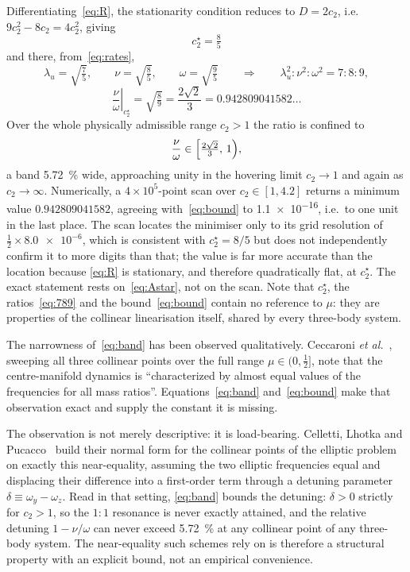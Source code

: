 \documentclass[pdflatex,sn-mathphys-num]{sn-jnl}
\begin{document}
Differentiating~\eqref{eq:R}, the stationarity condition reduces to $D=2c_2$,
i.e. $9c_2^{2}-8c_2=4c_2^{2}$, giving
\begin{equation}
  \boxed{\;c_2^\star = \tfrac{8}{5}\;}
  \label{eq:Astar}
\end{equation}
and there, from~\eqref{eq:rates},
\begin{equation}
  \lambda_u = \sqrt{\tfrac{7}{5}},\qquad
  \nu = \sqrt{\tfrac{8}{5}},\qquad
  \omega = \sqrt{\tfrac{9}{5}}
  \qquad\Longrightarrow\qquad
  \lambda_u^{2}:\nu^{2}:\omega^{2} = 7:8:9 ,
  \label{eq:789}
\end{equation}
\begin{equation}
  \left.\frac{\nu}{\omega}\right|_{c_2^\star} = \sqrt{\tfrac{8}{9}}
  = \frac{2\sqrt2}{3} = 0.942809041582\ldots
  \label{eq:bound}
\end{equation}
Over the whole physically admissible range $c_2>1$ the ratio is confined to
\begin{equation}
  \frac{\nu}{\omega} \in \Bigl[\tfrac{2\sqrt2}{3},\,1\Bigr) ,
  \label{eq:band}
\end{equation}
a band \SI{5.72}{\percent} wide, approaching unity in the hovering limit
$c_2\to1$ and again as $c_2\to\infty$. Numerically, a $4\times10^{5}$-point scan
over $c_2\in[1,4.2]$ returns a minimum value $0.942809041582$, agreeing
with~\eqref{eq:bound} to \num{1.1e-16}, i.e.\ to one unit in the last place.
The scan locates the minimiser only to its grid resolution of
$\tfrac12\times\num{8.0e-6}$, which is consistent with $c_2^\star=8/5$ but does
not independently confirm it to more digits than that; the value is far more
accurate than the location because \eqref{eq:R} is stationary, and therefore
quadratically flat, at $c_2^\star$. The exact statement rests
on~\eqref{eq:Astar}, not on the scan. Note that $c_2^\star$, the ratios~\eqref{eq:789} and the
bound~\eqref{eq:bound} contain no reference to $\mu$: they are properties of the
collinear linearisation itself, shared by every three-body system.

The narrowness of~\eqref{eq:band} has been observed qualitatively. Ceccaroni
\emph{et al.}~\cite{ceccaroni2016physd,ceccaroni2016}, sweeping all three collinear points over the
full range $\mu\in(0,\tfrac12]$, note that the centre-manifold dynamics is
``characterized by almost equal values of the frequencies for all mass
ratios''. Equations~\eqref{eq:band} and~\eqref{eq:bound} make that observation
exact and supply the constant it is missing.

The observation is not merely descriptive: it is load-bearing. Celletti, Lhotka
and Pucacco~\cite{celletti2024} build their normal form for the collinear points
of the elliptic problem on exactly this near-equality, assuming the two elliptic
frequencies equal and displacing their difference into a first-order term
through a detuning parameter $\delta\equiv\omega_y-\omega_z$. Read in that
setting, \eqref{eq:band} bounds the detuning: $\delta>0$ strictly for $c_2>1$,
so the $1{:}1$ resonance is never exactly attained, and the relative detuning
$1-\nu/\omega$ can never exceed \SI{5.72}{\percent} at any collinear point of
any three-body system. The near-equality such schemes rely on is therefore a
structural property with an explicit bound, not an empirical convenience.
\end{document}
